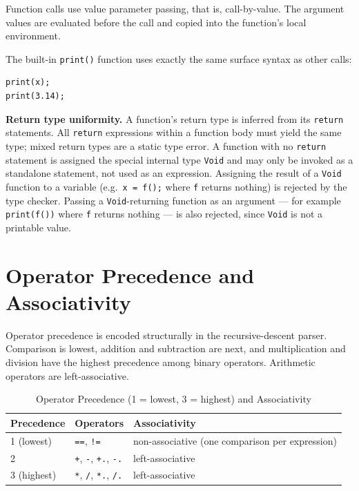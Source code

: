 Function calls use value parameter passing, that is, call-by-value. The
argument values are evaluated before the call and copied into the function's
local environment.

The built-in \texttt{print()} function uses exactly the same surface syntax as
other calls:

\begin{lstlisting}
print(x);
print(3.14);
\end{lstlisting}

\textbf{Return type uniformity.}
A function's return type is inferred from its \texttt{return} statements.
All \texttt{return} expressions within a function body must yield the same
type; mixed return types are a static type error. A function with no
\texttt{return} statement is assigned the special internal type \texttt{Void}
and may only be invoked as a standalone statement, not used as an expression.
Assigning the result of a \texttt{Void} function to a variable (e.g.\
\texttt{x = f();} where \texttt{f} returns nothing) is rejected by the type
checker. Passing a \texttt{Void}-returning function as an argument ---
for example \texttt{print(f())} where \texttt{f} returns nothing --- is also
rejected, since \texttt{Void} is not a printable value.

\section{Operator Precedence and Associativity}
Operator precedence is encoded structurally in the recursive-descent parser.
Comparison is lowest, addition and subtraction are next, and multiplication and
division have the highest precedence among binary operators. Arithmetic
operators are left-associative.

\begin{table}[H]
\centering
\caption{Operator Precedence (1 = lowest, 3 = highest) and Associativity}
\begin{tabular}{lll}
\toprule
Precedence & Operators & Associativity \\
\midrule
1 (lowest) & \texttt{==}, \texttt{!=} & non-associative (one comparison per expression) \\
2 & \texttt{+}, \texttt{-}, \texttt{+.}, \texttt{-.} & left-associative \\
3 (highest) & \texttt{*}, \texttt{/}, \texttt{*.}, \texttt{/.} & left-associative \\
\bottomrule
\end{tabular}
\end{table}

